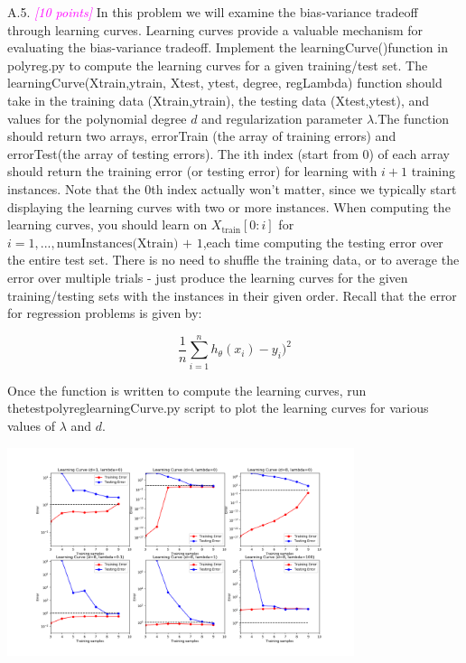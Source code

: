 \documentclass{article}
\newcommand{\1}{\mathbf{1}}
\newcommand{\points}[1]{\small\textcolor{magenta}{\emph{[#1 points]}} \normalsize}
\begin{document}
\newpage
A.5. \points{10} In this problem we will examine the bias-variance tradeoff through learning curves. Learning curves provide a valuable mechanism for evaluating the bias-variance tradeoff. Implement the learningCurve()function in polyreg.py to compute the learning curves for a given training/test set. The learningCurve(Xtrain,ytrain, Xtest, ytest, degree, regLambda) function should take in the training data (Xtrain,ytrain), the testing data (Xtest,ytest), and values for the polynomial degree $d$ and regularization parameter $\lambda$.The function should return two arrays, errorTrain (the array of training errors) and errorTest(the array of testing errors). The ith index (start from 0) of each array should return the training error (or testing error) for learning with $i+1$ training instances. Note that the 0th index actually won’t matter, since we typically start displaying the learning curves with two or more instances. When computing the learning curves, you should learn on $X_\text{train}[0:i]$ for $i= 1,...,\text{numInstances(Xtrain) + 1}$,each time computing the testing error over the entire test set. There is no need to shuffle the training data, or to average the error over multiple trials - just produce the learning curves for the given training/testing sets with the instances in their given order. Recall that the error for regression problems is given by:

$$\frac{1}{n}\sum_{i=1}^n h_\theta (x_i) - y_i)^2 $$

Once the function is written to compute the learning curves, run thetestpolyreglearningCurve.py script to plot the learning curves for various values of $\lambda$ and $d$.\\

\begin{center}
    \includegraphics[width=4in]{HW1/HW1_plots/LearningCurves.png}
\end{center} 
\end{document}
